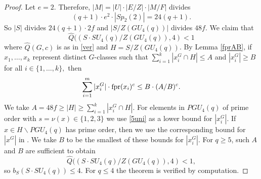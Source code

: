 \begin{proof}
Let $e=2.$ Therefore, $|M|=|U|\cdot|E/Z| \cdot |M/F|$ divides $$(q+1) \cdot e^2 \cdot |Sp_2(2)|=24(q+1).$$ So $|S|$ divides $24(q+1) \cdot 2f$ and $|S/Z(GU_4(q))|$ divides $48f.$ We claim that $$\hat{Q}((S \cdot SU_4(q)/Z(GU_4(q)),4)<1$$ where $\hat{Q}(G,c)$ is as in \eqref{ver} and $H=S/Z(GU_4(q))$. By Lemma \ref{fprAB}, if  $x_1,\ldots,x_k$ represent distinct $G$-classes such that $\sum_{i=1}^k |x_i^G \cap  H| \le A$ and $|x_i^G| \ge B$ for all $i \in \{1, \ldots, k\},$ then
$$\sum_{i=1}^m |x_i^G| \cdot {\mathrm{fpr}} (x_i)^c \le B \cdot (A/B)^c.$$ 
We take $A= 48 f \ge |H| \ge \sum_{i=1}^k |x_i^G \cap  H|.$ For elements in $PGU_4(q)$ of prime order with $s=\nu(x) \in \{1,2,3\}$ we use \eqref{5uni} as a lower bound for $|x_i^G|$. If $x \in H \backslash PGU_4(q)$ has prime order, then we use the corresponding bound for $|x^G|$ in \cite[Corollary 3.49]{fpr2}. We take $B$ to be the smallest of these bounds for $|x_i^G|.$ For $q \ge 5$, such $A$ and $B$ are sufficient to obtain $$\hat{Q}((S \cdot SU_4(q)/Z(GU_4(q)),4)<1,$$ so $b_S(S \cdot SU_4(q)) \le 4.$ For $q \le 4$ the theorem is verified by computation.
\end{proof}







